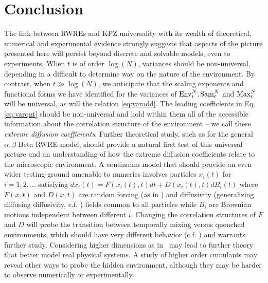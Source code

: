 \section{Conclusion}
The link between RWREs and KPZ universality with its wealth of theoretical, numerical and experimental evidence strongly suggests that aspects of the picture presented here will persist beyond discrete and solvable models, even to experiments. When $t$ is of order $\log(N)$, variances should be non-universal, depending in a difficult to determine way on the nature of the environment. By contrast, when $t\gg\log(N)$, we anticipate that the scaling exponents and functional forms we have identified for the variances of $\mathrm{Env}^{N}_t,\mathrm{Sam}^{N}_t$ and $\mathrm{Max}^{N}_t$ will be universal, as will the relation \eqref{eq:varadd}. The leading coefficients  in Eq. \eqref{eq:varqnt} should be non-universal and hold within them all of the accessible information about the correlation structure of the environment -- we call these {\it extreme diffusion coefficients}. Further theoretical study, such as for the general $\alpha,\beta$ Beta RWRE model, should provide a natural first test of this universal picture and an understanding of how the extreme diffusion coefficients relate to the microscopic environment. A continuum model that should provide an even wider testing-ground amenable to numerics involves particles $x_i(t)$ for $i=1,2,\ldots$ satisfying $dx_i(t) = F(x_i(t),t)dt + D(x_i(t),t) dB_i(t)$ where $F(x,t)$ and $D(x,t)$ are random forcing (as in \cite{le_doussal_diffusion_2017}) and diffusivity (generalizing diffusing diffusivity, c.f. \cite{PhysRevX.7.021002}) fields common to all particles while $B_i$ are  Brownian motions independent between different $i$. Changing the correlation structures of $F$ and $D$ will probe the transition between temporally mixing versus quenched environments, which should have very different behavior (c.f. \cite{PhysRevLett.61.500,PhysRevLett.62.3097}) and warrants further study. Considering higher dimensions as in~\cite{le_doussal_diffusion_2017} may lead to further theory that better model real physical systems. A study of higher order cumulants may reveal other ways to probe the hidden environment, although they may be harder to observe numerically or experimentally.

